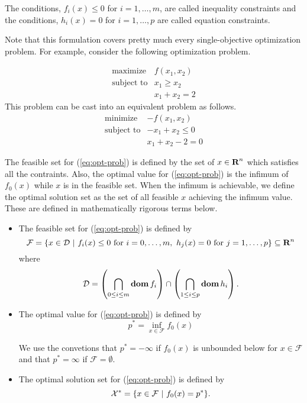 \documentclass[11pt, oneside]{article}   	%
\newcommand{\feasibleset}{\mathcal{F}}
\newcommand{\optsolset}{\mathcal{X}^\ast}
\begin{document}
The conditions, $f_i(x) \leq 0$ for $ i = 1, \ldots, m$, are called inequality constraints
and the conditions, $ h_i(x) = 0 $ for $ i = 1, \ldots, p$ are called equation constraints.

Note that this formulation covers pretty much every single-objective optimization problem.
For example,
consider the following optimization problem.

\begin{equation}
\begin{array}{ll}
\mbox{maximize} & f(x_1,x_2)
\\
\mbox{subject to} & x_1 \geq x_2
\\
& x_1 + x_2 = 2
\end{array}
\end{equation}
This problem can be cast into an equivalent problem as follows.
\begin{equation}
\begin{array}{ll}
\mbox{minimize} & -f(x_1,x_2)
\\
\mbox{subject to} & - x_1 + x_2 \leq 0
\\
& x_1 + x_2 - 2 = 0
\end{array}
\end{equation}


The feasible set for (\ref{eq:opt-prob}) is defined by the set of $x\in{\mbox{\bf R}}^n$ which satisfies all the contraints.
Also, the optimal value for (\ref{eq:opt-prob}) is the infimum of $f_0(x)$ while $x$ is in the feasible set.
When the infimum is achievable, we define the optimal solution set as the set of all feasible $x$ achieving
the infimum value.
These are defined in mathematically rigorous terms below.

\begin{itemize}

\item
The feasible set for (\ref{eq:opt-prob}) is defined by
\begin{equation}
\feasibleset
=
\set{x\in \mathcal{D}}
{ f_i(x)\leq 0 \mbox{ for } i =0, \ldots, m,\ h_j(x) = 0 \mbox{ for } j = 1,\ldots,p}
\subseteq \reals^n
\end{equation}
where
\begin{equation}
\mathcal{D} = \left( \bigcap_{0\leq i\leq m} \mathop{\bf dom} f_i \right) \cap \left( \bigcap_{1\leq i\leq p} \mathop{\bf dom} h_i \right).
\end{equation}

\item
The optimal value for (\ref{eq:opt-prob}) is defined by
\begin{equation}
p^\ast = \inf_{x\in\feasibleset} f_0(x)
\end{equation}

We use the convetions that $p^\ast = -\infty$ if $f_0(x)$ is unbounded below for $x\in \feasibleset$
and that $p^\ast = \infty$ if $\feasibleset = \emptyset$.

\item
The optimal solution set for (\ref{eq:opt-prob}) is defined by
\begin{equation}
\optsolset = \set{x\in\feasibleset}{f_0(x) = p^\ast}.
\end{equation}


\end{itemize}
\end{document}
